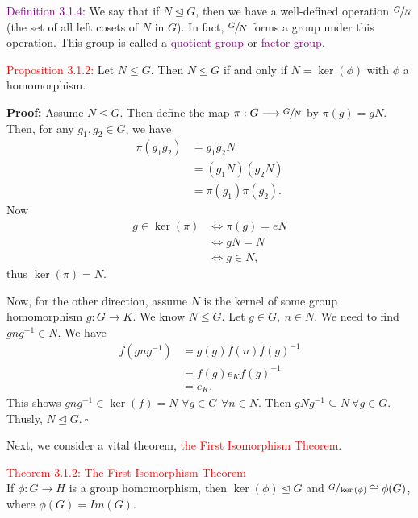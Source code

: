 \documentclass{article}
\begin{document}
\textcolor{purple}{Definition 3.1.4:} We say that if $N \trianglelefteq G$, then we have a well-defined operation $\sfrac{G}{N}$ (the set 
of all left cosets of $N$ in $G$). In fact, $\sfrac{G}{N}$ forms a group under this operation. This group is called a 
\textcolor{purple}{quotient group} or \textcolor{purple}{factor group}.

\textcolor{red}{Proposition 3.1.2:} Let $N \leq G$. Then $N \trianglelefteq G$ if and only if $N = \ker{(\phi)}$ with $\phi$ a 
homomorphism.

\textbf{Proof:} Assume $N \trianglelefteq G$. Then define the map $\pi: G \longrightarrow \sfrac{G}{N}$ by $\pi(g)=gN$. Then, for any 
$g_1,g_2 \in G$, we have
\begin{align*}
    \pi(g_1g_2) &= g_1g_2N \\
    &= (g_1N)(g_2N) \\
    &= \pi(g_1)\pi(g_2).
\end{align*}
Now
\begin{align*}
    g \in \ker{(\pi)} &\Longleftrightarrow \pi(g)=eN \\
    &\Longleftrightarrow gN=N \\
    &\Longleftrightarrow g \in N,
\end{align*}
thus $\ker{(\pi)}=N$. 

Now, for the other direction, assume $N$ is the kernel of some group homomorphism $g:G\longrightarrow K$. We know $N \leq G$. Let 
$g \in G, \ n \in N$. We need to find $gng^{-1}\in N$. We have
\begin{align*}
    f(gng^{-1})&=g(g)f(n)f(g)^{-1} \\
    &= f(g)e_Kf(g)^{-1} \\
    &= e_K.
\end{align*}
This shows $gng^{-1} \in \ker{(f)}=N$ $\forall g \in G$ $\forall n \in N$. Then $gNg^{-1} \subseteq N \ \forall g \in G$. Thusly, 
$N \trianglelefteq G. \ \square$

Next, we consider a vital theorem, \textcolor{red}{the First Isomorphism Theorem}.

\textcolor{red}{Theorem 3.1.2: The First Isomorphism Theorem}\\
If $\phi: G \longrightarrow H$ is a group homomorphism, then $\ker{(\phi)} \trianglelefteq G$ and $\sfrac{G}{\ker{(\phi)}} \cong \phi(G)$, 
where $\phi(G) = Im{(G)}$.
\end{document}
